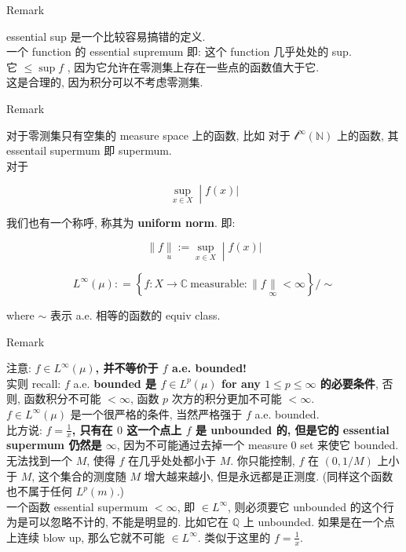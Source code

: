 \begin{qlremark}{Remark}

essential sup 是一个比较容易搞错的定义.\\
一个 function 的 essential supremum 即: 这个 function 几乎处处的 sup.\\
它 \(\leq \sup f\) , 因为它允许在零测集上存在一些点的函数值大于它.\\
这是合理的, 因为积分可以不考虑零测集.\\

\end{qlremark}

\begin{qlremark}{Remark}

对于零测集只有空集的 measure space 上的函数, 比如 对于 \(\mathcal{l}^{\infty}(\mathbb{N})\) 上的函数, 其 essentail supermum 即 supermum.\\
对于

\[\left. \sup\limits_{x \in X} \middle| f(x)| \right.\]

我们也有一个称呼, 称其为 \textbf{uniform norm}. 即:

\[\left. \parallel f\underset{u}{\parallel} := \sup\limits_{x \in X} \middle| f(x)| \right.\]

\end{qlremark}

\begin{definition}{}

\[L^{\infty}(\mu): = \left\{ {f:X\rightarrow\mathbb{C}\ \text{measurable}: \parallel f\underset{\infty}{\parallel} < \infty} \right\}/ \sim\]

where \(\sim\) 表示 a.e. 相等的函数的 equiv class.

\end{definition}

\begin{qlremark}{Remark}

注意: \textbf{\(f \in L^{\infty}(\mu)\), 并不等价于 \(f\) a.e. bounded!}\\
实则 recall: \(f\) a.e. \textbf{bounded 是 \(f \in L^{p}(\mu)\) for any \(1 \leq p \leq \infty\) 的必要条件}, 否则, 函数积分不可能 \(< \infty\), 函数 \(p\) 次方的积分更加不可能 \(< \infty\).\\
\(f \in L^{\infty}(\mu)\) 是一个很严格的条件, 当然严格强于 \(f\) a.e. bounded.\\
比方说: \textbf{\(f = \frac{1}{x}\), 只有在 \(0\) 这一个点上 \(f\) 是 unbounded 的, 但是它的 essential supermum 仍然是 \(\infty\)}, 因为不可能通过去掉一个 measure \(0\) set 来使它 bounded.\\
无法找到一个 \(M\), 使得 \(f\) 在几乎处处都小于 \(M\). 你只能控制, \(f\) 在 \((0,1/M)\) 上小于 \(M\), 这个集合的测度随 \(M\) 增大越来越小, 但是永远都是正测度. (同样这个函数也不属于任何 \(L^{p}(m)\).)\\
一个函数 essential supermum \(< \infty\), 即 \(\in L^{\infty}\), 则必须要它 unbounded 的这个行为是可以忽略不计的, 不能是明显的. 比如它在 \(\mathbb{Q}\) 上 unbounded. 如果是在一个点上连续 blow up, 那么它就不可能 \(\in L^{\infty}\). 类似于这里的 \(f = \frac{1}{x}\).\\

\end{qlremark}

